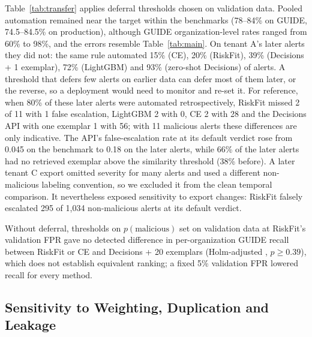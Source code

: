 \documentclass[letterpaper]{article} %
\begin{document}
Table~\ref{tab:transfer} applies deferral thresholds chosen on validation data. Pooled automation remained near the target within the benchmarks (78--84\% on GUIDE, 74.5--84.5\% on production), although GUIDE organization-level rates ranged from 60\% to 98\%, and the errors resemble Table~\ref{tab:main}. On tenant A's later alerts they did not: the same rule automated 15\% (CE), 20\% (RiskFit), 39\% (Decisions + 1 exemplar), 72\% (LightGBM) and 93\% (zero-shot Decisions) of alerts. A threshold that defers few alerts on earlier data can defer most of them later, or the reverse, so a deployment would need to monitor and re-set it. For reference, when 80\% of these later alerts were automated retrospectively, RiskFit missed 2 of 11 with 1 false escalation, LightGBM 2 with 0, CE 2 with 28 and the Decisions API with one exemplar 1 with 56; with 11 malicious alerts these differences are only indicative. The API's false-escalation rate at its default verdict rose from 0.045 on the benchmark to 0.18 on the later alerts, while 66\% of the later alerts had no retrieved exemplar above the similarity threshold (38\% before). A later tenant C export omitted severity for many alerts and used a different non-malicious labeling convention, so we excluded it from the clean temporal comparison. It nevertheless exposed sensitivity to export changes: RiskFit falsely escalated 295 of 1,034 non-malicious alerts at its default verdict.

Without deferral, thresholds on $p(\text{malicious})$ set on validation data at RiskFit's validation FPR gave no detected difference in per-organization GUIDE recall between RiskFit or CE and Decisions + 20 exemplars (Holm-adjusted \citep{holm1979}, $p{\ge}0.39$), which does not establish equivalent ranking; a fixed 5\% validation FPR lowered recall for every method.

\subsection{Sensitivity to Weighting, Duplication and Leakage}
\end{document}

